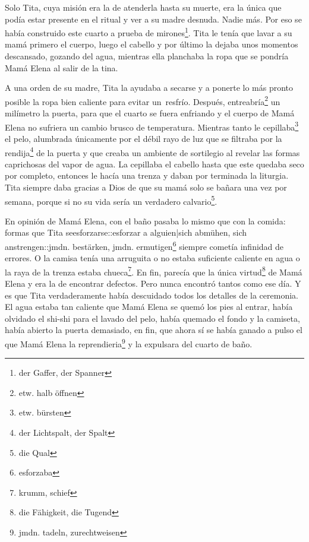 Solo Tita, cuya misión era la de atenderla hasta su muerte, era la única
que podía estar presente en el ritual y ver a su madre desnuda. Nadie
más. Por eso se había construido este cuarto a prueba de mirones\footnote{der Gaffer, der Spanner}.
Tita le tenía que lavar a su mamá primero el cuerpo, luego el cabello y por
último la dejaba unos momentos descansado, gozando del agua, mientras
ella planchaba la ropa que se pondría Mamá Elena al salir de la tina.

A una orden de su madre, Tita la ayudaba a secarse y a ponerte lo más
pronto posible la ropa bien caliente para evitar un~resfrío.
Después, entreabría\footnote{etw. halb öffnen} un milímetro
la puerta, para que el cuarto se fuera enfriando y el cuerpo de Mamá
Elena no sufriera un cambio brusco de temperatura. Mientras tanto le cepillaba\footnote{etw. bürsten} el pelo, alumbrada únicamente
por el débil rayo de luz que se filtraba por la rendija\footnote{der Lichtspalt, der Spalt}
de la puerta y que creaba un ambiente de sortilegio
al revelar las formas caprichosas del vapor de agua. La cepillaba el
cabello hasta que este quedaba seco por completo, entonces le hacía
una trenza y daban por terminada la liturgia. Tita siempre daba gracias
a Dios de que su mamá solo se bañara una vez por semana, porque si no
su vida sería un verdadero calvario\footnote{die Qual}.

En opinión de Mamá Elena, con el baño pasaba lo mismo que con la comida:
formas que Tita seesforzarse::esforzar a alguien|sich abmühen, sich anstrengen::jmdn. bestärken, jmdn. ermutigen\footnote{esforzaba}
siempre cometía infinidad de errores. O la camisa tenía una arruguita
o no estaba suficiente caliente en agua o la raya de la trenza estaba chueca\footnote{krumm, schief}. En fin,
parecía que la única virtud\footnote{die Fähigkeit, die Tugend} de
Mamá Elena y era la de encontrar defectos. Pero nunca encontró tantos
como ese día. Y es que Tita verdaderamente había descuidado todos los
detalles de la ceremonia. El agua estaba tan caliente que Mamá Elena se
quemó los pies al entrar, había olvidado el shi-shi para el lavado del
pelo, había quemado el fondo y la camiseta, había abierto la puerta
demasiado, en fin, que ahora sí se había ganado a pulso el que Mamá
Elena la reprendieria\footnote{jmdn. tadeln, zurechtweisen}
y la expulsara del cuarto de baño.

